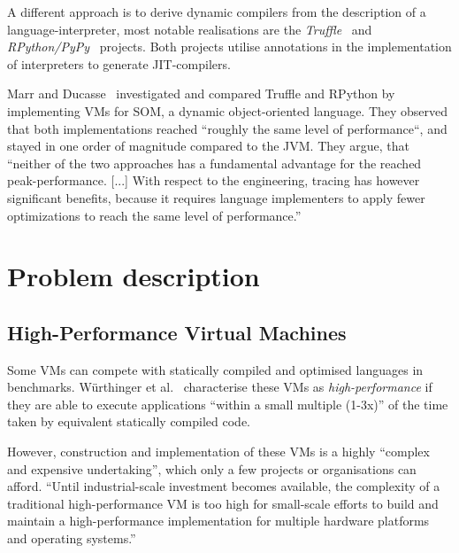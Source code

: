 A different approach is to derive dynamic compilers from the description of a
language-interpreter, most notable realisations are the
\emph{Truffle}~\cite{wurthinger2013one} and
\emph{RPython/PyPy}~\cite{bolz2009tracing} projects. Both projects utilise
annotations in the implementation of interpreters to generate JIT-compilers.

Marr and Ducasse~\cite{marr2015tracing} investigated and compared Truffle and
RPython by implementing VMs for SOM, a dynamic object-oriented language. They
observed that both implementations reached ``roughly the same level of
performance``, and stayed in one order of magnitude compared to the JVM. They
argue, that ``neither of the two approaches has a fundamental advantage for the
reached peak-performance. [...] With respect to the engineering, tracing has
however significant benefits, because it requires language implementers to apply
fewer optimizations to reach the same level of performance.''




\section{Problem description}






\subsection{High-Performance Virtual Machines}

Some VMs can compete with statically compiled and optimised languages in
benchmarks. W\"urthinger et al.~\cite{wurthinger2013one} characterise these VMs
as \emph{high-performance} if they are able to execute applications ``within a
small multiple (1-3x)'' of the time taken by equivalent statically compiled
code.

However, construction and implementation of these VMs is a highly ``complex and
expensive undertaking'', which only a few projects or organisations can afford.
``Until industrial-scale investment becomes available, the complexity of a
traditional high-performance VM is too high for small-scale efforts to build and
maintain a high-performance implementation for multiple hardware platforms and
operating systems.''~\cite{wurthinger2013one}


